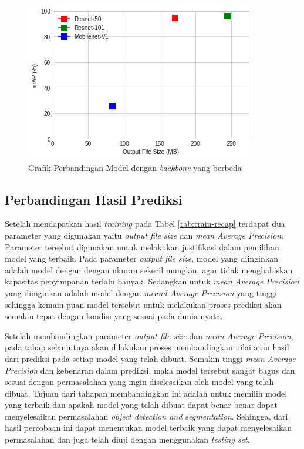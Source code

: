\newpage

\begin{figure}[h]
	\centering
	\includegraphics[scale=0.75]{gambar/graph-recap.png}
	\caption{Grafik Perbandingan Model dengan \textit{backbone} yang berbeda}
	\label{fig:graph-recap}
\end{figure}

\subsection{Perbandingan Hasil Prediksi}
\label{subsec:perbandingan-hasil-prediksi}

Setelah mendapatkan hasil \textit{training} pada Tabel \ref{tab:train-recap} terdapat dua parameter yang digunakan yaitu \textit{output file size} dan \textit{mean Average Precision}. Parameter tersebut digunakan untuk melakukan justifikasi dalam pemilihan model yang terbaik. Pada parameter \textit{output file size}, model yang diinginkan adalah model dengan dengan ukuran sekecil mungkin, agar tidak menghabiskan kapasitas penyimpanan terlalu banyak. Sedangkan untuk \textit{mean Average Precision} yang diinginkan adalah model dengan \textit{meand Average Precision} yang tinggi sehingga kemam puan model tersebut untuk melakukan proses prediksi akan semakin tepat dengan kondisi yang sesuai pada dunia nyata.

Setelah membandingkan parameter \textit{output file size} dan \textit{mean Average Precision}, pada tahap selanjutnya akan dilakukan proses membandingkan nilai atau hasil dari prediksi pada setiap model yang telah dibuat. Semakin tinggi \textit{mean Average Precision} dan kebenaran dalam prediksi, maka model tersebut sangat bagus dan sesuai dengan permasalahan yang ingin diselesaikan oleh model yang telah dibuat. Tujuan dari tahapan membandingkan ini adalah untuk memilih model yang terbaik dan apakah model yang telah dibuat dapat benar-benar dapat menyelesaikan permasalahan \textit{object detection and segmentation}. Sehingga, dari hasil percobaan ini dapat menentukan model terbaik yang dapat menyelesaikan permasalahan dan juga telah diuji dengan menggunakan\textit{ testing set}.

